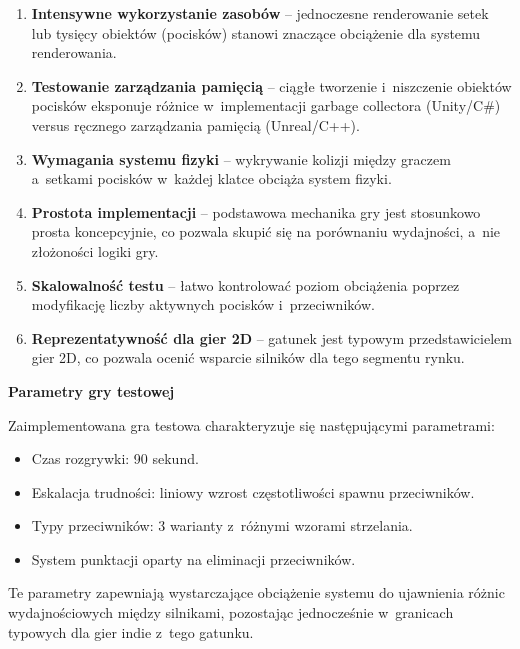 \begin{enumerate}
    \item \textbf{Intensywne wykorzystanie zasobów} -- jednoczesne renderowanie setek lub tysięcy obiektów (pocisków) stanowi znaczące obciążenie dla systemu renderowania.
    
    \item \textbf{Testowanie zarządzania pamięcią} -- ciągłe tworzenie i~niszczenie obiektów 
    pocisków eksponuje różnice w~implementacji garbage collectora (Unity/C\#) versus ręcznego 
    zarządzania pamięcią (Unreal/C++).
    
    \item \textbf{Wymagania systemu fizyki} -- wykrywanie kolizji między graczem a~setkami pocisków w~każdej klatce obciąża system fizyki.
    
    \item \textbf{Prostota implementacji} -- podstawowa mechanika gry jest stosunkowo prosta koncepcyjnie, co pozwala skupić się na porównaniu wydajności, a~nie złożoności logiki gry.
    
    \item \textbf{Skalowalność testu} -- łatwo kontrolować poziom obciążenia poprzez modyfikację liczby aktywnych pocisków i~przeciwników.
    
    \item \textbf{Reprezentatywność dla gier 2D} -- gatunek jest typowym przedstawicielem gier 2D, co pozwala ocenić wsparcie silników dla tego segmentu rynku.
    
\end{enumerate}

\textbf{Parametry gry testowej}

Zaimplementowana gra testowa charakteryzuje się następującymi parametrami:

\begin{itemize}
    \item Czas rozgrywki: 90 sekund.
    \item Eskalacja trudności: liniowy wzrost częstotliwości spawnu przeciwników.
    \item Typy przeciwników: 3 warianty z~różnymi wzorami strzelania.
    \item System punktacji oparty na eliminacji przeciwników.
\end{itemize}

Te parametry zapewniają wystarczające obciążenie systemu do ujawnienia różnic wydajnościowych między silnikami, pozostając jednocześnie w~granicach typowych dla gier indie z~tego gatunku.

